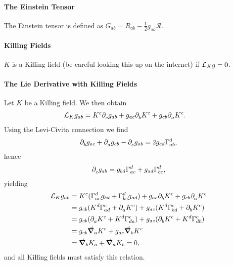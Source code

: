 \paragraph{The Einstein Tensor}
The Einstein tensor is defined as $G_{ab} = R_{ab} - \frac{1}{2}g_{ab}\mathcal{R}$.

\paragraph{Killing Fields}
$K$ is a Killing field (be careful looking this up on the internet) if $\mathcal{L}_{K}g = 0$.

\paragraph{The Lie Derivative with Killing Fields}
Let $K$ be a Killing field. We then obtain
\begin{align*}
	\mathcal{L}_{K}g_{ab} &= K^{c}\partial^{}_{c}{g_{ab}} + g_{ac}\partial^{}_{b}{K^{c}} + g_{cb}\partial^{}_{a}{K^{c}}.
\end{align*}
Using the Levi-Civita connection we find
\begin{align*}
	\del{}{b}{g_{ac}} + \del{}{a}{g_{cb}} - \del{}{c}{g_{ab}} = 2g_{cd}\chris{d}{a}{b},
\end{align*}
hence
\begin{align*}
	\del{}{c}{g_{ab}} = g_{bd}\chris{d}{a}{c} + g_{ad}\chris{d}{b}{c},
\end{align*}
yielding
\begin{align*}
	\lied{K}{g_{ab}} &= K^{c}(\chris{d}{a}{c}g_{bd} + \chris{d}{b}{c}g_{ad}) + g_{ac}\del{}{b}{K^{c}} + g_{cb}\del{}{a}{K^{c}} \\
	                 &= g_{cb}(K^{d}\chris{c}{a}{d} + \del{}{a}{K^{c}}) + g_{ac}(K^{d}\chris{c}{b}{d} + \del{}{b}{K^{c}}) \\
	                 &= g_{cb}(\del{}{a}{K^{c}} + K^{d}\chris{c}{d}{a}) + g_{ac}(\del{}{b}{K^{c}} + K^{d}\chris{c}{d}{b}) \\
	                 &= g_{cb}\dcov{a}{K^{c}} + g_{ac}\dcov{b}{K^{c}} \\
	                 &= \dcov{b}{K_{a}} + \dcov{a}{K_{b}} = 0,
\end{align*}
and all Killing fields must satisfy this relation.

